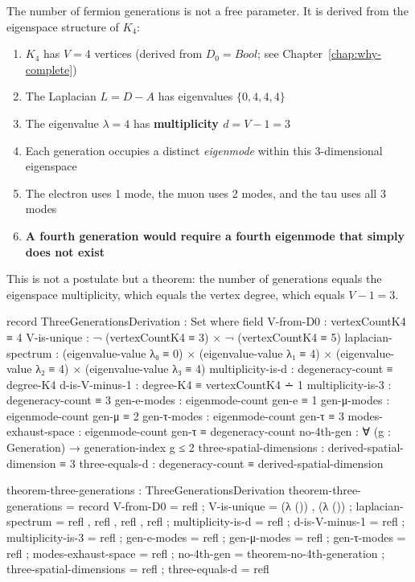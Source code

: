 \documentclass[11pt,a4paper]{book}
\def\text#1{#1}%
\begin{document}
The number of fermion generations is not a free parameter. It is derived from the 
eigenspace structure of $K_4$:

\begin{enumerate}
\item $K_4$ has $V = 4$ vertices (derived from $D_0 = \text{Bool}$; see Chapter~\ref{chap:why-complete})
\item The Laplacian $L = D - A$ has eigenvalues $\{0, 4, 4, 4\}$
\item The eigenvalue $\lambda = 4$ has \textbf{multiplicity $d = V - 1 = 3$}
\item Each generation occupies a distinct \emph{eigenmode} within this 3-dimensional eigenspace
\item The electron uses 1 mode, the muon uses 2 modes, and the tau uses all 3 modes
\item \textbf{A fourth generation would require a fourth eigenmode that simply does not exist}
\end{enumerate}

This is not a postulate but a theorem: the number of generations equals the 
eigenspace multiplicity, which equals the vertex degree, which equals $V - 1 = 3$.

\begin{code}
record ThreeGenerationsDerivation : Set where
  field
    V-from-D0          : vertexCountK4 ≡ 4
    V-is-unique        : ¬ (vertexCountK4 ≡ 3) × ¬ (vertexCountK4 ≡ 5)
    laplacian-spectrum : (eigenvalue-value λ₀ ≡ 0) × 
                         (eigenvalue-value λ₁ ≡ 4) × 
                         (eigenvalue-value λ₂ ≡ 4) × 
                         (eigenvalue-value λ₃ ≡ 4)
    multiplicity-is-d  : degeneracy-count ≡ degree-K4
    d-is-V-minus-1     : degree-K4 ≡ vertexCountK4 ∸ 1
    multiplicity-is-3  : degeneracy-count ≡ 3
    gen-e-modes : eigenmode-count gen-e ≡ 1
    gen-μ-modes : eigenmode-count gen-μ ≡ 2
    gen-τ-modes : eigenmode-count gen-τ ≡ 3
    modes-exhaust-space : eigenmode-count gen-τ ≡ degeneracy-count
    no-4th-gen : ∀ (g : Generation) → generation-index g ≤ 2
    three-spatial-dimensions : derived-spatial-dimension ≡ 3
    three-equals-d           : degeneracy-count ≡ derived-spatial-dimension

theorem-three-generations : ThreeGenerationsDerivation
theorem-three-generations = record
  { V-from-D0          = refl
  ; V-is-unique        = (λ ()) , (λ ())
  ; laplacian-spectrum = refl , refl , refl , refl
  ; multiplicity-is-d  = refl
  ; d-is-V-minus-1     = refl
  ; multiplicity-is-3  = refl
  ; gen-e-modes        = refl
  ; gen-μ-modes        = refl
  ; gen-τ-modes        = refl
  ; modes-exhaust-space = refl
  ; no-4th-gen         = theorem-no-4th-generation
  ; three-spatial-dimensions = refl
  ; three-equals-d     = refl
  }
\end{code}
\end{document}

